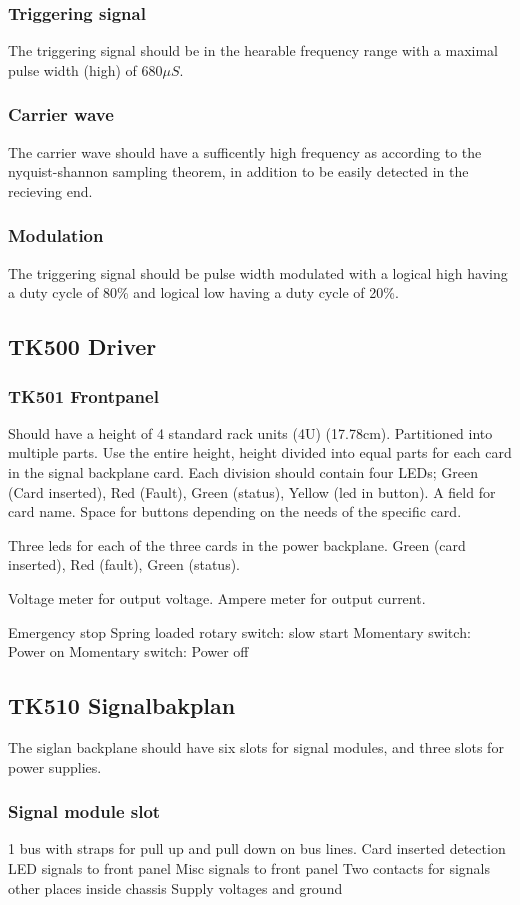 \subsubsection{Triggering signal}
The triggering signal should be in the hearable frequency range with a maximal pulse width (high) of $680\mu S$.
\subsubsection{Carrier wave}
The carrier wave should have a sufficently high frequency as according to the nyquist-shannon sampling theorem, in addition to be easily detected in the recieving end.
\subsubsection{Modulation}
The triggering signal should be pulse width modulated with a logical high having a duty cycle of 80\% and logical low having a duty cycle of 20\%.

\subsection{TK500 Driver}

\subsubsection{TK501 Frontpanel}
Should have a height of 4 standard rack units (4U) (17.78cm). Partitioned into multiple parts.
Use the entire height, height divided into equal parts for each card in the signal backplane card. Each division should contain four LEDs; Green (Card inserted), Red (Fault), Green (status), Yellow (led in button). A field for card name. Space for buttons depending on the needs of the specific card.

Three leds for each of the three cards in the power backplane. Green (card inserted), Red (fault), Green (status).

Voltage meter for output voltage.
Ampere meter for output current.

Emergency stop
Spring loaded rotary switch: slow start
Momentary switch: Power on
Momentary switch: Power off

\subsection{TK510 Signalbakplan}
The siglan backplane should have six slots for signal modules, and three slots for power supplies.
\subsubsection{Signal module slot}
1 bus with straps for pull up and pull down on bus lines.
Card inserted detection
LED signals to front panel
Misc signals to front panel
Two contacts for signals other places inside chassis
Supply voltages and ground